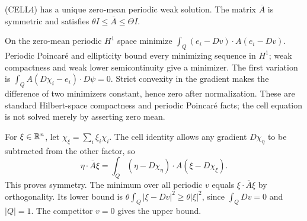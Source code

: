 \begin{lemma}
(CELL4) has a unique zero-mean periodic weak solution.
The matrix $\overline A$ is symmetric and satisfies
$\theta I\leq\overline A\leq\Theta I$.
\end{lemma}
\begin{expandedproof}
On the zero-mean periodic $H^1$ space minimize
$\int_Q(e_i-Dv)\cdot A(e_i-Dv)$.
Periodic Poincar\'e and ellipticity bound every minimizing sequence
in $H^1$; weak compactness and weak lower semicontinuity give a minimizer.
The first variation is
$\int_Q A(D\chi_i-e_i)\cdot D\psi=0$.
Strict convexity in the gradient makes the difference of two
minimizers constant, hence zero after normalization.
These are standard Hilbert-space compactness and periodic Poincar\'e
facts; the cell equation is not solved merely by asserting zero mean.

For $\xi\in\mathbb{R}^n$, let $\chi_\xi=\sum_i\xi_i\chi_i$.
The cell identity allows any gradient $D\chi_\eta$ to be subtracted
from the other factor, so
\[
 \eta\cdot\overline A\xi
 =\int_Q(\eta-D\chi_\eta)\cdot A(\xi-D\chi_\xi).
\]
This proves symmetry.
The minimum over all periodic $v$ equals
$\xi\cdot\overline A\xi$ by orthogonality.
Its lower bound is
$\theta\int_Q|\xi-Dv|^2\geq\theta|\xi|^2$,
since $\int_QDv=0$ and $|Q|=1$.
The competitor $v=0$ gives the upper bound.
\end{expandedproof}

